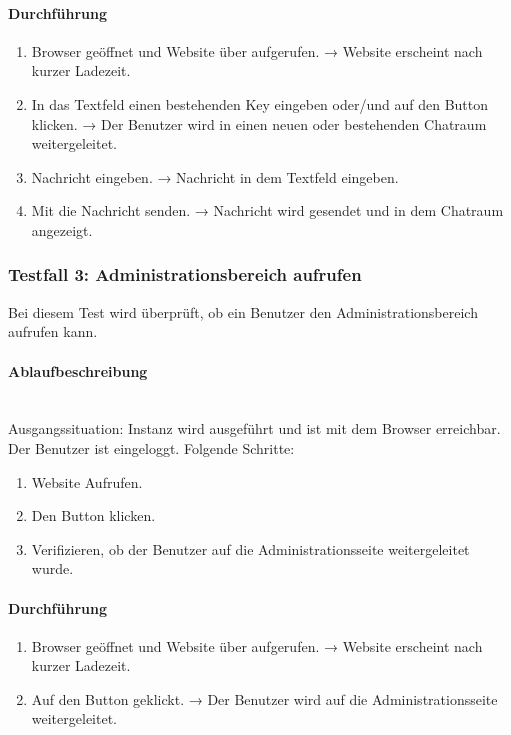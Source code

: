 \paragraph{Durchführung}
\begin{enumerate}
  \item Browser geöffnet und Website über  aufgerufen. \newline
  → Website erscheint nach kurzer Ladezeit.
  \item In das Textfeld  einen bestehenden Key eingeben oder/und auf den Button  klicken. \newline
  → Der Benutzer wird in einen neuen oder bestehenden Chatraum weitergeleitet.
  \item Nachricht eingeben. \newline
  → Nachricht in dem Textfeld  eingeben.
  \item Mit  die Nachricht senden. \newline
  → Nachricht wird gesendet und in dem Chatraum angezeigt.
\end{enumerate}

\subsubsection{Testfall 3: Administrationsbereich aufrufen}
Bei diesem Test wird überprüft, ob ein Benutzer den Administrationsbereich aufrufen kann.
\paragraph{Ablaufbeschreibung} \mbox{}\\
Ausgangssituation: Instanz wird ausgeführt und ist mit dem Browser erreichbar. Der Benutzer ist eingeloggt. Folgende Schritte: 
\begin{enumerate}
  \item Website Aufrufen.
  \item Den Button  klicken.
  \item Verifizieren, ob der Benutzer auf die Administrationsseite weitergeleitet wurde.
\end{enumerate}

\paragraph{Durchführung}
\begin{enumerate}
  \item Browser geöffnet und Website über  aufgerufen. \newline
  → Website erscheint nach kurzer Ladezeit.
  \item Auf den Button  geklickt. \newline
  → Der Benutzer wird auf die Administrationsseite weitergeleitet.
\end{enumerate}